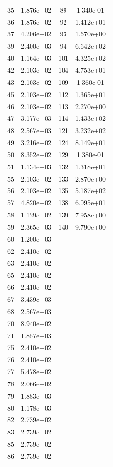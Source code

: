 \documentclass[12pt]{article}
\begin{document}
\begin{longtable}{@{}cccc@{}}
35 & 1.876e+02 & 89 & 1.340e-01 \\
36 & 1.876e+02 & 92 & 1.412e+01 \\
37 & 4.206e+02 & 93 & 1.670e+00 \\
39 & 2.400e+03 & 94 & 6.642e+02 \\
40 & 1.164e+03 & 101 & 4.325e+02 \\
42 & 2.103e+02 & 104 & 4.753e+01 \\
43 & 2.103e+02 & 109 & 1.360e-01 \\
45 & 2.103e+02 & 112 & 1.365e+01 \\
46 & 2.103e+02 & 113 & 2.270e+00 \\
47 & 3.177e+03 & 114 & 1.433e+02 \\
48 & 2.567e+03 & 121 & 3.232e+02 \\
49 & 3.216e+02 & 124 & 8.149e+01 \\
50 & 8.352e+02 & 129 & 1.380e-01 \\
51 & 1.134e+03 & 132 & 1.318e+01 \\
55 & 2.103e+02 & 133 & 2.870e+00 \\
56 & 2.103e+02 & 135 & 5.187e+02 \\
57 & 4.820e+02 & 138 & 6.095e+01 \\
58 & 1.129e+02 & 139 & 7.958e+00 \\
59 & 2.365e+03 & 140 & 9.790e+00 \\
60 & 1.200e+03 &  &  \\
62 & 2.410e+02 &  &  \\
63 & 2.410e+02 &  &  \\
65 & 2.410e+02 &  &  \\
66 & 2.410e+02 &  &  \\
67 & 3.439e+03 &  &  \\
68 & 2.567e+03 &  &  \\
70 & 8.940e+02 &  &  \\
71 & 1.857e+03 &  &  \\
75 & 2.410e+02 &  &  \\
76 & 2.410e+02 &  &  \\
77 & 5.478e+02 &  &  \\
78 & 2.066e+02 &  &  \\
79 & 1.883e+03 &  &  \\
80 & 1.178e+03 &  &  \\
82 & 2.739e+02 &  &  \\
83 & 2.739e+02 &  &  \\
85 & 2.739e+02 &  &  \\
86 & 2.739e+02 &  &  \\

\end{longtable}
\end{document}
